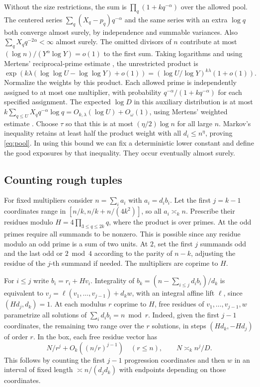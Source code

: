 \documentclass[11pt]{article}
\begin{document}
Without the size restrictions, the sum is
\(\prod_q(1+kq^{-\alpha})\) over the allowed pool. The centered
series \(\sum_q (X_q-p_q)q^{-\alpha}\) and the same series
with an extra \(\log q\) both converge almost surely, by
independence and summable variances. Also
\(\sum_q X_q q^{-2\alpha}<\infty\) almost surely.
The omitted divisors of \(n\) contribute at most
\((\log n)/(Y^\alpha\log Y)=o(1)\) to the first sum.
Taking logarithms and using Mertens' reciprocal-prime estimate
\cite[Theorem~5]{RS}, the unrestricted product is
\[
 \exp\!\left(k\lambda(\log\log U-\log\log Y)+o(1)\right)
       =(\log U/\log Y)^{k\lambda}(1+o(1)).
\]
Normalize the weights by this product. Each allowed prime is
independently assigned to at most one multiplier, with probability
\(q^{-\alpha}/(1+kq^{-\alpha})\) for each specified assignment.
The expected \(\log D\) in this auxiliary distribution is at most
\(k\sum_{q\le U}X_q q^{-\alpha}\log q
=O_{k,\lambda}(\log U)+O_\omega(1)\), using Mertens' weighted
estimate \cite[Theorem~6]{RS}. Choose \(\tau\) so that this is
at most \((\eta/2)\log n\) for all large \(n\). Markov's inequality
retains at least half the product weight with all \(d_i\le n^\eta\),
proving \eqref{eq:pool}. In using this bound we can fix a
deterministic lower constant and define the good exposures by
that inequality. They occur eventually almost surely.

\subsection{Counting rough tuples}

For fixed multipliers consider \(n=\sum_i a_i\) with
\(a_i=d_i b_i\). Let the first \(j=k-1\) coordinates range in
\([n/k,n/k+n/(4k^2)]\), so all \(a_i\asymp_k n\).
Prescribe their residues modulo \(H=4\prod_{3\le q\le2k}q\),
where the product is over primes. At the odd primes require all
summands to be nonzero. This is possible since any residue modulo
an odd prime is a sum of two units. At \(2\), set the first \(j\)
summands odd and the last odd or \(2\bmod4\) according to the
parity of \(n-k\), adjusting the residue of the \(j\)-th summand
if needed. The multipliers are coprime to \(H\).

For \(i\le j\) write \(b_i=r_i+H v_i\). Integrality of
\(b_k=(n-\sum_{i\le j}d_i b_i)/d_k\) is equivalent to
\(v_j=\ell(v_1,\ldots,v_{j-1})+d_k w\), with an integral affine
lift \(\ell\), since \((H d_j,d_k)=1\). At each modulus \(r\)
coprime to \(H\), free residues of \(v_1,\ldots,v_{j-1},w\)
parametrize all solutions of \(\sum_i d_i b_i=n\bmod r\).
Indeed, given the first \(j-1\) coordinates, the remaining two
range over the \(r\) solutions, in steps \((Hd_k,-Hd_j)\) of
order \(r\). In the box, each free residue vector has
\[
             N/r^j+O_k((n/r)^{j-1})
             \quad (r\le n),\qquad N\asymp_k n^j/D .
\]
This follows by counting the first \(j-1\) progression coordinates
and then \(w\) in an interval of fixed length
\(\asymp n/(d_jd_k)\) with endpoints depending on those coordinates.
\end{document}
